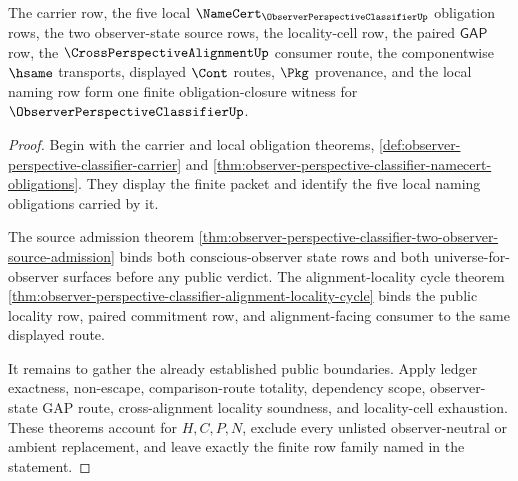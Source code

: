 \begin{theorem}
\label{thm:observer-perspective-classifier-obligation-closure-witness}
The carrier row, the five local $\NameCert_{\ObserverPerspectiveClassifierUp}$ obligation rows, the two observer-state source rows, the locality-cell row, the paired $\mathsf{GAP}$ row, the $\CrossPerspectiveAlignmentUp$ consumer route, the componentwise $\hsame$ transports, displayed $\Cont$ routes, $\Pkg$ provenance, and the local naming row form one finite obligation-closure witness for $\ObserverPerspectiveClassifierUp$.
\end{theorem}
\begin{proof}
Begin with the carrier and local obligation theorems, \autoref{def:observer-perspective-classifier-carrier} and \autoref{thm:observer-perspective-classifier-namecert-obligations}. They display the finite packet and identify the five local naming obligations carried by it.

The source admission theorem \autoref{thm:observer-perspective-classifier-two-observer-source-admission} binds both conscious-observer state rows and both universe-for-observer surfaces before any public verdict. The alignment-locality cycle theorem \autoref{thm:observer-perspective-classifier-alignment-locality-cycle} binds the public locality row, paired commitment row, and alignment-facing consumer to the same displayed route.

It remains to gather the already established public boundaries. Apply ledger exactness, non-escape, comparison-route totality, dependency scope, observer-state GAP route, cross-alignment locality soundness, and locality-cell exhaustion. These theorems account for $H,C,P,N$, exclude every unlisted observer-neutral or ambient replacement, and leave exactly the finite row family named in the statement.
\end{proof}

